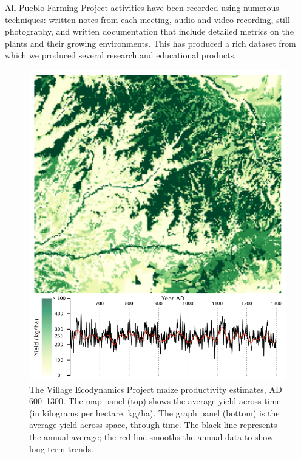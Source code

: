 \documentclass[12pt,]{article}
\begin{document}
All Pueblo Farming Project activities have been recorded using numerous techniques: written notes from each meeting, audio and video recording, still photography, and written documentation that include detailed metrics on the plants and their growing environments. This has produced a rich dataset from which we produced several research and educational products.

\begin{figure}
\centering
\includegraphics{./images/vep.svg}
\caption{The Village Ecodynamics Project maize productivity estimates, AD 600--1300. The map panel (top) shows the average yield across time (in kilograms per hectare, kg/ha). The graph panel (bottom) is the average yield across space, through time. The black line represents the annual average; the red line smooths the annual data to show long-term trends.}
\end{figure}
\end{document}
